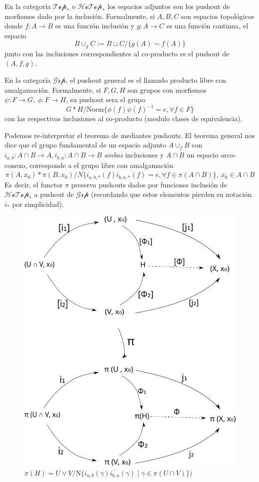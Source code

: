 En la categoría \(\mathscr{Top}_*\) o \(\mathscr{HoTop}_*\) los espacios
adjuntos son los pushout de morfismos dado por la inclusión. Formalmente,
si \(A,B,C\) son espacios topológicos donde \(f : A \to B \) es una
función inclusión y \( g : A \to C \) es una función continua, el
espacio
\[ B \cup_{g} C := B \sqcup C / \{g(A) \sim f(A)\} \]
junto con las inclusiones correspondientes al co-producto es el pushout
de \( (A, f , g) \).

En la categoría \(\mathscr{Grp}\), el pushout general es el llamado
producto libre con amalgamación. Formalmente, si \(F,G,H\) son grupos
con morfismos \(\psi : F \to G ,\ \phi : F \to H\), su pushout sera el
grupo
\[ G * H / \text{Norm}\{ \phi(f) \psi(f)^{-1} = e , \forall f \in F\}\]
con las respectivas inclusiones al co-producto (modulo clases de
equivalencia).

Podemos re-interpretar el teorema de \vank mediantes pushouts. El
teorema general nos dice que el grupo fundamental de un espacio adjunto
\(A \cup_f B\) con \(i_{a,b} : A \cap B \to A, i_{b,a} : A \cap B \to B
\) \emph{ambas} inclusiones y \(A \cap B\) un espacio arco-conexo,
corresponde a el grupo libre con amalgamación
\[\pi (A, x_0) * \pi (B , x_0) / N \{i_{a,b,*} (f)
\overline{i_{b,a,*} (f)} = e , \forall f \in \pi (A \cap B)\},\ x_0 \in
A \cap B \]
Es decir, el functor \(\pi\) preserva pushouts dados por funciones
inclusión de \(\mathscr{HoTop}_*\) a pushout de \(\mathscr{Grp}\)
(recordando que estos elementos pierden su notación \(i_*\) por
simplicidad).
\begin{figure}[h]
  \centering \includegraphics[scale=0.4]{./imagenes/pushoutHotop.png}
  \caption*{\(H = (U \cup_{i_1} V, {x_0, y_0})\)}
  \caption*{\(\pi (H) = U \vee V/ \text{N}\{i_{a,b}(\gamma)\overline{i_{b,a}}
    (\gamma) \mid \gamma \in \pi(U \cap V)\})\)}
\end{figure}

